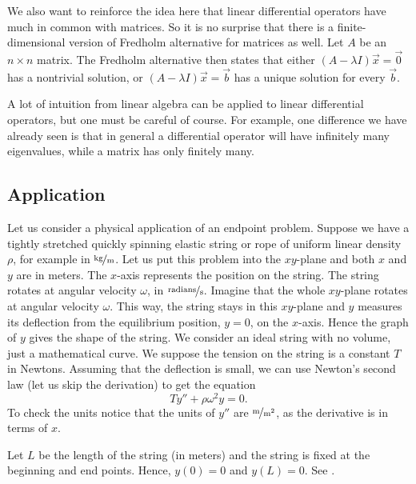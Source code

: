 \documentclass{ximera}
\begin{document}
We also want to reinforce the idea here that linear differential operators have much in common with matrices.  So it is no surprise that there is a finite-dimensional version of Fredholm alternative for matrices as well.  Let $A$ be an $n \times n$ matrix.  The Fredholm alternative then states that either $(A-\lambda I) \vec{x} = \vec{0}$ has a nontrivial solution, or $(A-\lambda I) \vec{x} = \vec{b}$ has a unique solution for every $\vec{b}$.

A lot of intuition from linear algebra can be applied to linear differential operators, but one must be careful of course.  For example, one  difference we have already seen is that in general a differential operator will have infinitely many eigenvalues, while a matrix has only finitely many.

\subsection{Application}

Let us consider a physical application of an endpoint problem. Suppose we have a tightly stretched quickly spinning elastic string or rope of uniform linear density $\rho$, for example in $\unitfrac{kg}{m}$. Let us put this problem into the $xy$-plane and both $x$ and $y$ are in meters.  The $x$-axis represents the position on the string.  The string rotates at angular velocity $\omega$, in $\unitfrac{radians}{s}$. Imagine that the whole $xy$-plane rotates at angular velocity $\omega$. This way, the string stays in this $xy$-plane and $y$ measures its deflection from the equilibrium position, $y=0$, on the $x$-axis. Hence the graph of $y$ gives the shape of the string. We consider an ideal string with no volume, just a mathematical curve. We suppose the tension on the string is a constant $T$ in Newtons.
Assuming that the deflection is small, we can use Newton's second law (let us skip the derivation) to get the equation
\begin{equation*}
    T y'' + \rho \omega^2 y = 0 .
\end{equation*}
To check the units notice that the units of $y''$ are $\unitfrac{m}{m^2}$, as the derivative is in terms of $x$.

Let $L$ be the length of the string (in meters) and the string is fixed at the beginning and end points.  Hence, $y(0) = 0$ and $y(L) = 0$.  See .
\end{document}
